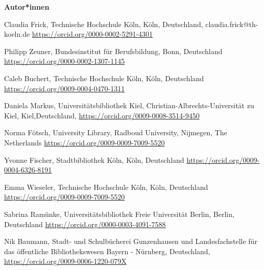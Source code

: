 \documentclass[a4paper,
fontsize=11pt,
oneside,
numbers=noperiodatend,
parskip=half-,
bibliography=totoc,
final
]{scrartcl}
\begin{document}
\textbf{Autor*innen}

Claudia Frick, Technische Hochschule Köln, Köln, Deutschland, claudia.frick@th-koeln.de\newline
\url{https://orcid.org/0000-0002-5291-4301}

Philipp Zeuner, Bundesinstitut für Berufsbildung, Bonn, Deutschland\newline
\url{https://orcid.org/0000-0002-1307-1145}

Caleb Buchert, Technische Hochschule Köln, Köln, Deutschland\newline
\url{https://orcid.org/0009-0004-0470-1311}

Daniela Markus, Universitätsbibliothek Kiel, Christian-Albrechts-Universität zu Kiel, Kiel,\linebreak Deutschland, \url{https://orcid.org/0009-0008-3514-9450}

Norma Fötsch, University Library, Radboud University, Nijmegen, The Netherlands\newline
\url{https://orcid.org/0009-0009-7009-5520}

Yvonne Fischer, Stadtbibliothek Köln, Köln, Deutschland\newline
\url{https://orcid.org/0009-0004-6326-8191}

Emma Wieseler, Technische Hochschule Köln, Köln, Deutschland\newline
\url{https://orcid.org/0009-0009-7009-5520}

Sabrina Ramünke, Universitätsbibliothek Freie Universität Berlin, Berlin, Deutschland\newline
\url{https://orcid.org/0000-0003-4091-7588}

Nik Baumann, Stadt- und Schulbücherei Gunzenhausen und Landesfachstelle für das öffentliche Bibliothekswesen Bayern - Nürnberg, Deutschland, \url{https://orcid.org/0009-0006-1220-079X}
\end{document}
